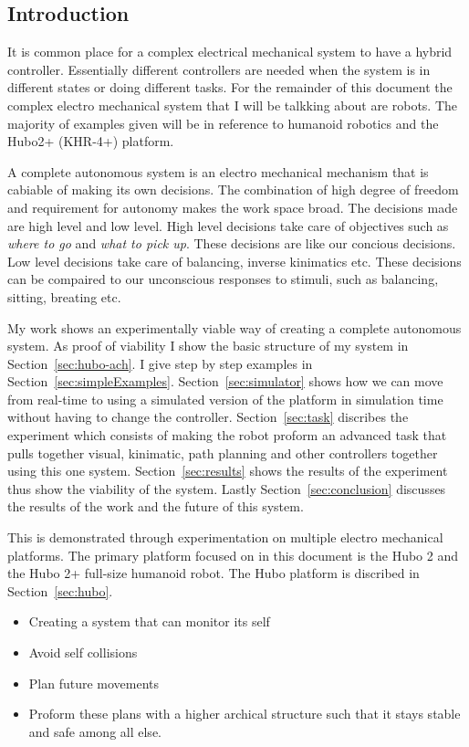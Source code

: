\subsection{Introduction}

It is common place for a complex electrical mechanical system to have a hybrid controller.  
Essentially different controllers are needed when the system is in different states or doing different tasks.
For the remainder of this document the complex electro mechanical system that I will be talkking about are robots.
The majority of examples given will be in reference to humanoid robotics and the Hubo2+ (KHR-4+) platform.

A complete autonomous system is an electro mechanical mechanism that is cabiable of making its own decisions.
The combination of high degree of freedom and requirement for autonomy makes the work space broad.
The decisions made are high level and low level.
High level decisions take care of objectives such as \textit{where to go} and \textit{what to pick up}. 
These decisions are like our concious decisions.
Low level decisions take care of balancing, inverse kinimatics etc.
These decisions can be compaired to our unconscious responses to stimuli, such as balancing, sitting, breating etc.

My work shows an experimentally viable way of creating a complete autonomous system.  
As proof of viability I show the basic structure of my system in Section~\ref{sec:hubo-ach}.  
I give step by step examples in Section~\ref{sec:simpleExamples}.
Section~\ref{sec:simulator} shows how we can move from real-time to using a simulated version of the platform in simulation time without having to change the controller.
Section~\ref{sec:task} discribes the experiment which consists of making the robot proform an advanced task that pulls together visual, kinimatic, path planning and other controllers together using this one system.
Section~\ref{sec:results} shows the results of the experiment thus show the viability of the system.
Lastly Section~\ref{sec:conclusion} discusses the results of the work and the future of this system.


This is demonstrated through experimentation on multiple electro mechanical platforms.
The primary platform focused on in this document is the Hubo 2 and the Hubo 2+ full-size humanoid robot.
The Hubo platform is discribed in Section~\ref{sec:hubo}.




\begin{itemize}
\item Creating a system that can monitor its self
\item Avoid self collisions
\item Plan future movements
\item Proform these plans with a higher archical structure such that it stays stable and safe among all else.
\end{itemize}
